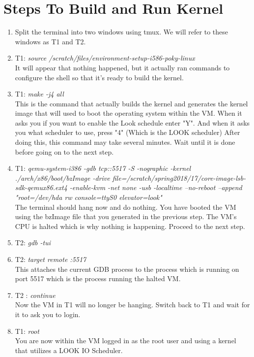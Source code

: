 \documentclass[onecolumn,draftclsnofoot, 10pt, compsoc]{IEEEtran}
\begin{document}
\section{Steps To Build and Run Kernel}
	\begin{enumerate}
		\item
			Split the terminal into two windows using tmux.
			We will refer to these windows as T1 and T2. 
		\item
			T1: \textit{source /scratch/files/environment-setup-i586-poky-linux} \\
			It will appear that nothing happened, but it actually ran commands to configure the shell so that it’s ready to build the kernel. 
		\item
			T1: \textit{make -j4 all} \\
			This is the command that actually builds the kernel and generates the kernel image that will used to boot the operating system within the VM. 
			When it asks you if you want to enable the Look schedule enter "Y". And when it asks you what scheduler to use, press "4" (Which is the LOOK scheduler)
			After doing this, this command may take several minutes. 
			Wait until it is done before going on to the next step.
		\item
			T1: 
			\textit{qemu-system-i386 -gdb tcp::5517 -S -nographic -kernel ./arch/x86/boot/bzImage -drive file=/scratch/spring2018/17/core-image-lsb-sdk-qemux86.ext4 -enable-kvm -net none -usb -localtime --no-reboot --append "root=/dev/hda rw console=ttyS0 elevator=look"} \\
			The terminal should hang now and do nothing. 
			You have booted the VM using the bzImage file that you generated in the previous step. 
			The VM’s CPU is halted which is why nothing is happening. 
			Proceed to the next step.	
		\item
			T2: \textit{gdb -tui}
		\item
			T2: \textit{target remote :5517} \\
			This attaches the current GDB process to the process which is running on port 5517 which is the process running the halted VM.
		\item
			T2 : \textit{continue} \\
			Now the VM in T1 will no longer be hanging. 
			Switch back to T1 and wait for it to ask you to login.
		\item
			T1: \textit{root} \\
			You are now within the VM logged in as the root user and using a kernel that utilizes a LOOK IO Scheduler. 
	\end{enumerate}
\end{document}
